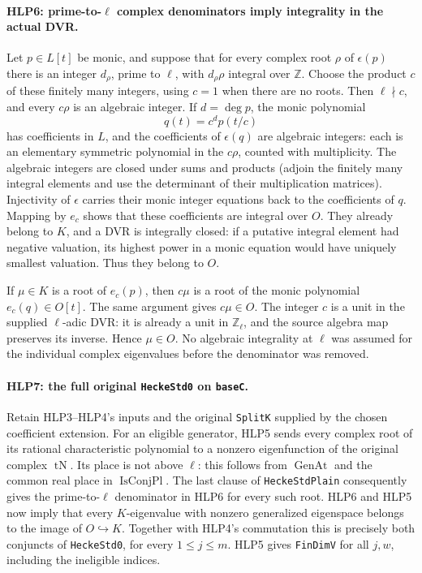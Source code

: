\paragraph{HLP6: prime-to-\(\ell\) complex denominators imply integrality in the actual DVR.}
\label{claim:HLP6}
Let \(p\in L[t]\) be monic, and suppose that for every complex root
\(\rho\) of \(\epsilon(p)\) there is an integer \(d_\rho\), prime to
\(\ell\), with \(d_\rho\rho\) integral over \(\mathbb Z\). Choose the
product \(c\) of these finitely many integers, using \(c=1\) when
there are no roots. Then \(\ell\nmid c\), and every \(c\rho\) is an
algebraic integer. If \(d=\deg p\), the monic polynomial
\[
             q(t)=c^d p(t/c)                         \tag{HLP.5}
\]
has coefficients in \(L\), and the coefficients of \(\epsilon(q)\)
are algebraic integers: each is an elementary symmetric polynomial
in the \(c\rho\), counted with multiplicity. The algebraic integers
are closed under sums and products (adjoin the finitely many
integral elements and use the determinant of their multiplication
matrices). Injectivity of \(\epsilon\) carries their monic integer
equations back to the coefficients of \(q\). Mapping by \(e_c\)
shows that these coefficients are integral over \(O\). They already
belong to \(K\), and a DVR is integrally closed: if a putative
integral element had negative valuation, its highest power in a
monic equation would have uniquely smallest valuation. Thus they
belong to \(O\).

If \(\mu\in K\) is a root of \(e_c(p)\), then \(c\mu\) is a root
of the monic polynomial \(e_c(q)\in O[t]\). The same argument gives
\(c\mu\in O\). The integer \(c\) is a unit in the supplied
\(\ell\)-adic DVR: it is already a unit in \(\mathbb Z_\ell\), and
the source algebra map preserves its inverse. Hence \(\mu\in O\).
No algebraic integrality at \(\ell\) was assumed for the individual
complex eigenvalues before the denominator was removed.

\paragraph{HLP7: the full original \texttt{Hecke\allowbreak Std0} on \texttt{base\allowbreak C}.}
\label{claim:HLP7}
Retain HLP3--HLP4's inputs and the original \texttt{Split\allowbreak K} supplied
by the chosen coefficient extension. For an eligible generator,
HLP5 sends every complex root of its rational characteristic
polynomial to a nonzero eigenfunction of the original complex
\(\operatorname{tN}\). Its place is not above \(\ell\): this follows
from \(\operatorname{GenAt}\) and the common real place in
\(\operatorname{IsConjPl}\). The last clause of
\texttt{Hecke\allowbreak Std\allowbreak Plain} consequently gives the prime-to-\(\ell\)
denominator in HLP6 for every such root. HLP6 and HLP5 now imply
that every \(K\)-eigenvalue with nonzero generalized eigenspace
belongs to the image of \(O\hookrightarrow K\). Together with
HLP4's commutation this is precisely both conjuncts of
\texttt{Hecke\allowbreak Std0}, for every \(1\le j\le m\). HLP5 gives
\texttt{Fin\allowbreak Dim\allowbreak V} for all \(j,w\), including the ineligible indices.


